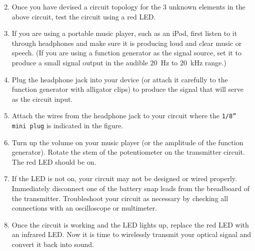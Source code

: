 \documentclass[12pt]{../manual}
\begin{document}
\begin{enumerate}
\setcounter{enumi}{1}
\item Once you have devised a circuit topology for the 3 unknown elements in the above circuit, test the circuit using a red LED.
\item If you are using a portable music player, such as an iPod, first listen to it through headphones and make sure it is producing loud and clear music or speech. (If you are using a function generator as the signal source, set it to produce a small signal output in the audible \SI{20}{\hertz} to \SI{20}{\kilo\hertz} range.)
\item Plug the headphone jack into your device (or attach it carefully to the function generator with alligator clips) to produce the signal that will serve as the circuit input.
\item Attach the wires from the headphone jack to your circuit where the {\tt 1/8'' mini plug} is indicated in the figure.
\item Turn up the volume on your music player (or the amplitude of the function generator). Rotate the stem of the potentiometer on the transmitter circuit. The red LED should be on.
\item If the LED is not on, your circuit may not be designed or wired properly. Immediately disconnect one of the battery snap leads from the breadboard of the transmitter. Troubleshoot your circuit as necessary by checking all connections with an oscilloscope or multimeter.
\item Once the circuit is working and the LED lights up, replace the red LED with an infrared LED. Now it is time to wirelessly transmit your optical signal and convert it back into sound.
\end{enumerate}
\end{document}
